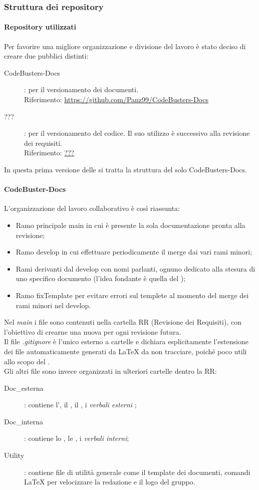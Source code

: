 \subsubsection{Struttura dei repository}
\paragraph{Repository utilizzati}
Per favorire una migliore organizzazione e divisione del lavoro è stato deciso di creare due  pubblici distinti:
\begin{description}
	\item[CodeBusters-Docs] : per il versionamento dei documenti. \\
	Riferimento: \url{https://github.com/Panz99/CodeBusters-Docs}
	\item[???] : per il versionamento del codice. Il suo utilizzo è successivo alla revisione dei requisiti. \\
	Riferimento: \url{???}
\end{description}
In questa prima versione delle \NdPv si tratta la struttura del solo  CodeBusters-Docs. 

\paragraph{CodeBuster-Docs}
L'organizzazione del lavoro collaborativo è così riassunta:
\begin{itemize}
	\item Ramo principale main in cui è presente la sola documentazione pronta alla revisione;	
	\item Ramo develop in cui effettuare periodicamente il merge dai vari rami minori;
	\item Rami derivanti dal develop con nomi parlanti, ognuno dedicato alla stesura di uno specifico documento (l'idea fondante è quella del );
	\item Ramo fixTemplate per evitare errori sul templete al momento del merge dei rami minori nel develop.
\end{itemize}
Nel \textit{main} i file sono contenuti nella cartella RR (Revisione dei Requisiti), con l'obiettivo di crearne una nuova per ogni revisione futura. \\
Il file \textit{.gitignore} è l'unico esterno a cartelle e dichiara esplicitamente l'estensione dei file automaticamente generati da \LaTeX{} da non tracciare, poiché poco utili allo scopo del . \\
Gli altri file sono invece organizzati in ulteriori cartelle dentro la RR:
\begin{description}
	\item[Doc\_esterna] : contiene l'\AdRv, il \PdPv, il \Glossariov, i \textit{verbali esterni} ;
	\item[Doc\_interna] : contiene lo \SdFv, le \NdPv, i \textit{verbali interni};
	\item[Utility] : contiene file di utilità generale come il template dei documenti, comandi \LaTeX{} per velocizzare la redazione e il logo del gruppo.
\end{description}

